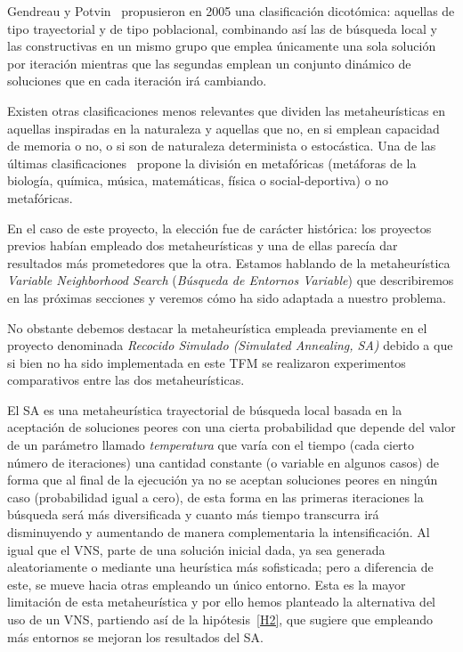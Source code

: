 Gendreau y Potvin~\cite{metaheuristicas:taxonomia2} propusieron en 2005 una clasificación dicotómica: aquellas de tipo trayectorial y de tipo poblacional, combinando así las de búsqueda local y las constructivas en un mismo grupo que emplea únicamente una sola solución por iteración mientras que las segundas emplean un conjunto dinámico de soluciones que en cada iteración irá cambiando.

Existen otras clasificaciones menos relevantes que dividen las metaheurísticas en aquellas inspiradas en la naturaleza y aquellas que no, en si emplean capacidad de memoria o no, o si son de naturaleza determinista o estocástica. Una de las últimas clasificaciones~\cite{sota:metaheuristicas} propone la división en metafóricas (metáforas de la biología, química, música, matemáticas, física o social-deportiva) o no metafóricas.

En el caso de este proyecto, la elección fue de carácter histórica: los proyectos previos habían empleado dos metaheurísticas y una de ellas parecía dar resultados más prometedores que la otra. Estamos hablando de la metaheurística \textit{Variable Neighborhood Search} (\textit{Búsqueda de Entornos Variable}) que describiremos en las próximas secciones y veremos cómo ha sido adaptada a nuestro problema.

No obstante debemos destacar la metaheurística empleada previamente en el proyecto \legacy{} denominada \textit{Recocido Simulado (Simulated Annealing, SA)} debido a que si bien no ha sido implementada en este TFM se realizaron experimentos comparativos entre las dos metaheurísticas.

El SA es una metaheurística trayectorial de búsqueda local basada en la aceptación de soluciones peores con una cierta probabilidad que depende del valor de un parámetro llamado \textit{temperatura} que varía con el tiempo (cada cierto número de iteraciones) una cantidad constante (o variable en algunos casos) de forma que al final de la ejecución ya no se aceptan soluciones peores en ningún caso (probabilidad igual a cero), de esta forma en las primeras iteraciones la búsqueda será más diversificada y cuanto más tiempo transcurra irá disminuyendo y aumentando de manera complementaria la intensificación. Al igual que el VNS, parte de una solución inicial dada, ya sea generada aleatoriamente o mediante una heurística más sofisticada; pero a diferencia de este, se mueve hacia otras empleando un único entorno. Esta es la mayor limitación de esta metaheurística y por ello hemos planteado la alternativa del uso de un VNS, partiendo así de la hipótesis~\ref{H2}, que sugiere que empleando más entornos se mejoran los resultados del SA\@.

